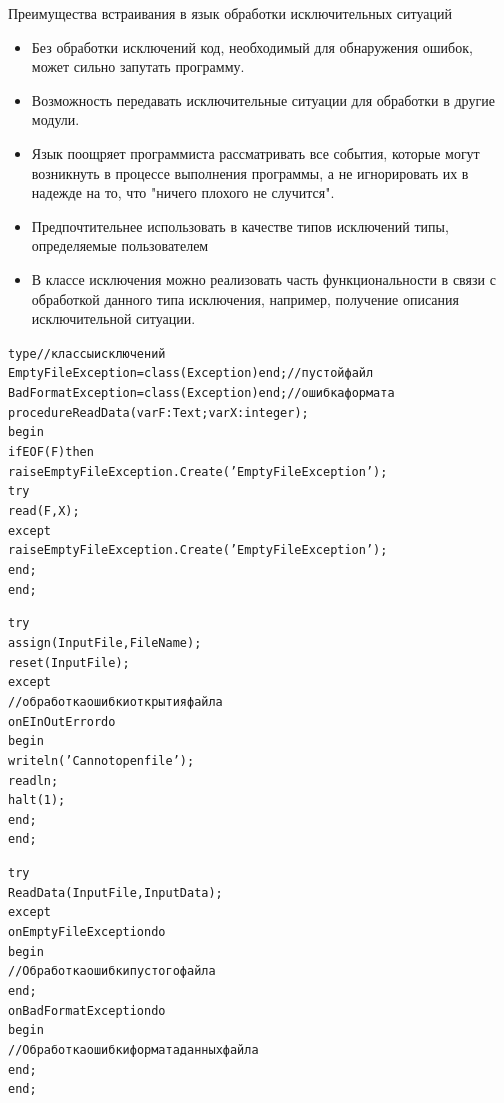 \documentclass{beamer}
\begin{document}
\begin{frame}{Преимущества встраивания в язык обработки исключительных ситуаций}
\begin{itemize}
\item Без обработки исключений код, необходимый для обнаружения ошибок,
может сильно запутать программу. 
\item Возможность передавать исключительные ситуации для обработки в другие модули.
\item Язык поощряет программиста рассматривать все события, которые могут
возникнуть в процессе выполнения программы, а не игнорировать их в надежде на то, что "ничего плохого не случится".
\end{itemize}
\end{frame}

\begin{frame}[fragile]
\begin{itemize}
\item Предпочтительнее использовать в качестве типов исключений типы, определяемые пользователем
\item В классе исключения можно реализовать часть функциональности в связи с обработкой данного типа исключения, например, получение описания исключительной ситуации.
\end{itemize}
\begin{alltt}
type //классы исключений
  EmptyFileException = class(Exception) end;//пустой файл
  BadFormatException = class(Exception) end;//ошибка формата
procedure ReadData(var F: Text; var X: integer);
begin
  if EOF(F) then 
    raise EmptyFileException.Create('EmptyFileException');
  try 
    read(F, X);
  except
    raise EmptyFileException.Create('EmptyFileException');
  end;
end;
\end{alltt}
\end{frame}

\begin{frame}[fragile]
\begin{alltt}
  try
    assign(InputFile, FileName);
    reset(InputFile);
  except
    //обработка ошибки открытия файла
    on EInOutError do
      begin
        writeln('Cannot open file');
        readln;
        halt(1);
      end;
  end;
\end{alltt}
\end{frame}

\begin{frame}[fragile]
\begin{alltt}
  try
    ReadData(InputFile, InputData);
  except
    on EmptyFileException do
      begin
        // Обработка ошибки пустого файла
      end;
    on BadFormatException do
      begin
        // Обработка ошибки формата данных файла
      end;
  end;
\end{alltt}
\end{frame}
\end{document}
